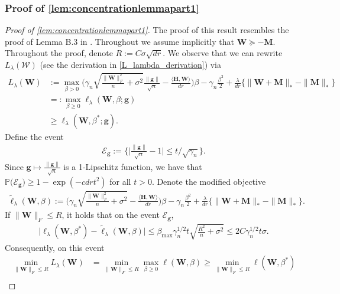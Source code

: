 \documentclass[10pt]{article}
\newcommand{\s}{^*}
\newcommand{\p}{\mathbb{P}}
\renewcommand{\tilde}{\widetilde}
\theoremstyle{definition}
\begin{document}
\subsubsection{Proof of \cref{lem:concentrationlemmapart1}}
\label{sec:concentrationlemmapart1proof}
\begin{proof}[Proof of \cref{lem:concentrationlemmapart1}]
The proof of this result resembles the proof of Lemma B.3 in \citet{celentano_lasso_2023}. Throughout we assume implicitly that $\bm{W} \succcurlyeq -\bm{M}$.  
Throughout the proof, denote $R := C \sigma \sqrt{dr}$. 
We observe that we can rewrite $L_{\lambda}(\mathcal{W})$ (see the derivation in \eqref{L_lambda_derivation}) via
\begin{align}
    L_{\lambda}(\bm{W}) &:= \max_{\beta > 0}  \bigg(\gamma_n \sqrt{\frac{\| \bm{W} \|_F^2 }{n} + \sigma^2} \frac{\|\bm{g}\|}{\sqrt{n}} - \frac{\langle \bm{H},\bm{W}\rangle}{dr} \bigg) \beta - \gamma_n \frac{\beta^2}{2} + \frac{\lambda}{dr} \big\{ \|\bm{W} + \bm{M} \|_* - \| \bm{M}\|_* \big\} \\
    &=: \max_{\beta \geq 0} \ell_{\lambda}(\bm{W},\beta; \bm{g}) \\
    &\geq \ell_{\lambda}(\bm{W}, \beta\s; \bm{g}).
\end{align}
Define the event
\begin{align}
    \mathcal{E}_{{\bm{g}}} := \bigg\{ \bigg| \frac{\|\bm{g}\|}{\sqrt{n}} - 1 \bigg| \leq t /\sqrt{\gamma_n} \bigg\}.
\end{align}
Since $\bm{g} \mapsto \frac{\|\bm{g}\|}{\sqrt{n}}$ is a 1-Lipschitz function, we have that $\p\big(\mathcal{E}_{{\bm{g}}}\big) \geq 1 - \exp( -c dr t^2)$ for all $t > 0$.  
Denote the modified objective
\begin{align}
    \tilde\ell_{\lambda}(\bm{W},\beta) := \bigg(\gamma_n \sqrt{\frac{\| \bm{W} \|_F^2 }{n} + \sigma^2} - \frac{\langle \bm{H},\bm{W}\rangle}{dr} \bigg) \beta - \gamma_n \frac{\beta^2}{2} + \frac{\lambda}{dr} \big\{ \|\bm{W} + \bm{M} \|_* - \| \bm{M}\|_* \big\}.
\end{align}
If  $\|\bm{W}\|_F \leq R$, it holds that on  the event $\mathcal{E}_{\bm{g}}$,
\begin{align}
    \big| \ell_{\lambda}(\bm{W},\beta\s)- \tilde \ell_{\lambda}(\bm{W},\beta) \big| \leq \beta_{\max} \gamma_n^{1/2} t   \sqrt{\frac{R^2}{n} + \sigma^2} \leq 2C \gamma_n^{1/2} t \sigma.
\end{align}
Consequently, on this event
\begin{align}
    \min_{\|\bm{W}\|_F \leq R }L_{\lambda}(\bm{W}) &= \min_{\|\bm{W}\|_F \leq R} \max_{\beta \geq 0} \ell(\bm{W},\beta) \geq \min_{\| \bm{W}\|_F \leq R} \ell(\bm{W}, \beta\s) \\

\end{align}
\end{proof}
\end{document}
